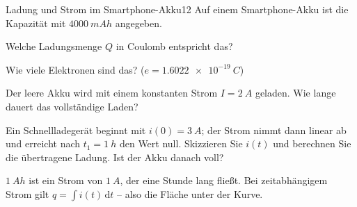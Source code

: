 \documentclass[11pt,a4paper]{article}
\begin{document}

\begin{aufgabe}{Ladung und Strom im Smartphone-Akku}{12}
Auf einem Smartphone-Akku ist die Kapazität mit $\SI{4000}{mAh}$ angegeben.
\begin{teilaufgaben}
  \item Welche Ladungsmenge $Q$ in Coulomb entspricht das?
  \item Wie viele Elektronen sind das? ($e = \SI{1.6022e-19}{C}$)
  \item Der leere Akku wird mit einem konstanten Strom $I = \SI{2}{A}$ geladen. Wie lange dauert das vollständige Laden?
  \item Ein Schnellladegerät beginnt mit $i(0) = \SI{3}{A}$; der Strom nimmt dann linear ab und erreicht nach $t_1 = \SI{1}{h}$ den Wert null.
        Skizzieren Sie $i(t)$ und berechnen Sie die übertragene Ladung. Ist der Akku danach voll?
\end{teilaufgaben}
\begin{tipp}$\SI{1}{Ah}$ ist ein Strom von $\SI{1}{A}$, der eine Stunde lang fließt. Bei zeitabhängigem Strom gilt $q = \int i(t)\,\mathrm{d}t$ -- also die Fläche unter der Kurve.\end{tipp}
\end{aufgabe}
\end{document}
